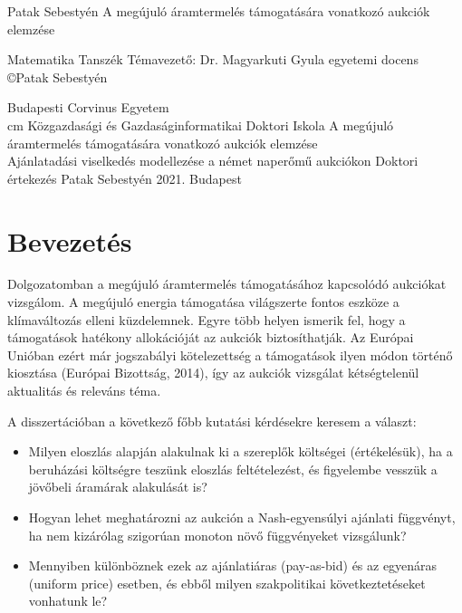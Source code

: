 \documentclass[twoside, magyar, showtrims]{corvinusphd}
\renewcommand{\author}{Patak Sebestyén}
\renewcommand{\title}{A megújuló áramtermelés támogatására vonatkozó aukciók elemzése}
\newcommand{\department}{Matematika Tanszék}
\newcommand{\advisor}{Dr. Magyarkuti Gyula egyetemi docens}
\newcommand{\BCE}{Budapesti Corvinus Egyetem}
\newcommand{\school}{Közgazdasági és Gazdaságinformatikai Doktori Iskola}
\newcommand{\subtitle}{Ajánlatadási viselkedés modellezése a német naperőmű aukciókon}
\newcommand{\submitted}{2021. Budapest}
\begin{document}
\frontmatter*
\thispagestyle{empty}
\begin{center}
\vspace*{\fill}
    \Large{{\author}}
    \vskip 2cm
    \large{{\title}}
\vspace*{\fill}
\end{center}
\newpage

\thispagestyle{empty}
\begin{center}
    \department
    \vskip 4cm
    Témavezető: \advisor
    \vskip 15cm
    \copyright\author
\end{center}
\newpage

\thispagestyle{empty}
\begin{center}
    \BCE \\
    cm
    \school 
    \vskip 4cm
  \Large{{\title}} \\
  
    \large{\subtitle}
    \vskip 5cm    
    Doktori értekezés 
    \vskip 2cm
    \author
    \vskip 4cm
    \submitted
 \end{center}
\cleardoublepage

\tableofcontents*
\listoffigures
\listoftables

\mainmatter*
\chapter{Bevezetés}

\scwords Dolgozatomban a megújuló áramtermelés támogatásához kapcsolódó aukciókat vizsgálom.
A megújuló energia támogatása világszerte
fontos eszköze a klímaváltozás elleni küzdelemnek.
Egyre több helyen ismerik fel, hogy
a támogatások hatékony allokációját az aukciók
biztosíthatják. Az Európai Unióban ezért már jogszabályi kötelezettség
a támogatások ilyen módon történő kiosztása (Európai Bizottság, 2014),
így az aukciók vizsgálat kétségtelenül aktualitás és releváns téma.

A disszertációban a következő főbb kutatási kérdésekre keresem a választ:

\begin{itemize}
    \item
    Milyen eloszlás alapján alakulnak ki a szereplők költségei (értékelésük), ha a beruházási költségre teszünk eloszlás feltételezést, és figyelembe vesszük a jövőbeli áramárak alakulását is?
    \item
    Hogyan lehet meghatározni az aukción a Nash-egyensúlyi ajánlati függvényt, ha nem kizárólag szigorúan monoton növő függvényeket vizsgálunk?
    \item
    Mennyiben különböznek ezek az ajánlatiáras (pay-as-bid) és az egyenáras (uniform price) esetben, és ebből milyen szakpolitikai következtetéseket vonhatunk le? 
\end{itemize}
\end{document}
